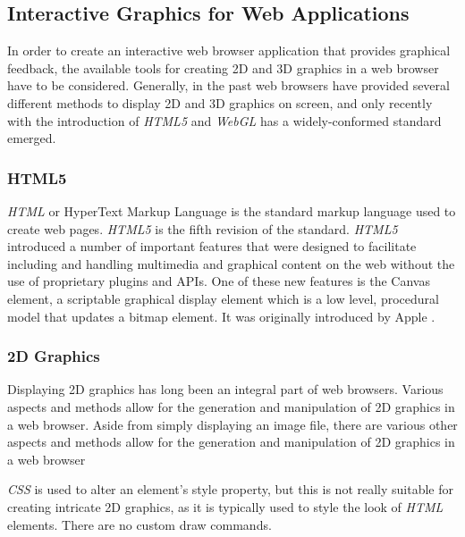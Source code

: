 \documentclass[a4paper,11pt,titlepage]{article}
\begin{document}
\subsection{Interactive Graphics for Web Applications}

In order to create an interactive web browser application that provides graphical feedback, the available tools for creating 2D and 3D graphics in a web browser have to be considered. Generally, in the past web browsers have provided several different methods to display 2D and 3D graphics on screen, and only recently with the introduction of \textit{HTML5} and \textit{WebGL} has a widely-conformed standard emerged.

\subsubsection{HTML5}

\textit{HTML} or HyperText Markup Language is the standard markup language used to create web pages. \textit{HTML5} is the fifth revision of the standard. \textit{HTML5} introduced a number of important features that were designed to facilitate including and handling multimedia and graphical content on the web without the use of proprietary plugins and APIs. One of these new features is the Canvas element, a scriptable graphical display element which is a low level, procedural model that updates a bitmap element. It was originally introduced by Apple \cite{canvas} .

\subsubsection{2D Graphics}

Displaying 2D graphics has long been an integral part of web browsers. Various aspects and methods allow for the generation and manipulation of 2D graphics in a web browser. Aside from simply displaying an image file, there are various other aspects and methods allow for the generation and manipulation of 2D graphics in a web browser

\textit{CSS} is used to alter an element's style property, but this is not really suitable for creating intricate 2D graphics, as it is typically used to style the look of \textit{HTML} elements. There are no custom draw commands.
\end{document}
